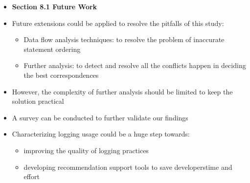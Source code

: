 \documentclass{article}
\newcommand{\bold}{\textbf}
\begin{document}
\begin{itemize} [leftmargin=.1in]
\item \bold{Section 8.1 Future Work} 
\item Future extensions could be applied to resolve the pitfalls of this study:
\begin{itemize}
\item Data flow analysis techniques: to resolve the problem of inaccurate statement ordering
\item Further analysis: to detect and resolve all the conflicts happen in deciding the best correspondences
\end{itemize}
\item However, the complexity of further analysis should be limited to keep the solution practical 
\item A survey can be conducted to further validate our findings
\item Characterizing logging usage could be a huge step towards:
\begin{itemize}
\item improving the quality of logging practices %
\item developing recommendation support tools to save developers\textquotesingle time and effort 
\end{itemize}

\end{itemize} %
\end{document}
